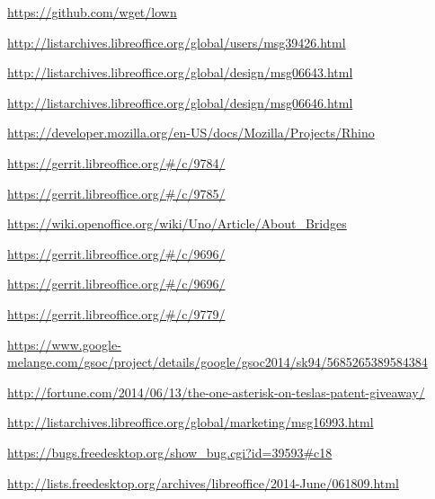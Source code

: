 \documentclass{article}
\begin{document}
\begin{thebibliography}{30}

\url{https://github.com/wget/lown}

    \url{http://listarchives.libreoffice.org/global/users/msg39426.html}

    \url{http://listarchives.libreoffice.org/global/design/msg06643.html}

    \url{http://listarchives.libreoffice.org/global/design/msg06646.html}

    \url{https://developer.mozilla.org/en-US/docs/Mozilla/Projects/Rhino}

    \url{https://gerrit.libreoffice.org/#/c/9784/}

    \url{https://gerrit.libreoffice.org/#/c/9785/}

    \url{https://wiki.openoffice.org/wiki/Uno/Article/About_Bridges}

    \url{https://gerrit.libreoffice.org/#/c/9696/}

    \url{https://gerrit.libreoffice.org/#/c/9696/}

    \url{https://gerrit.libreoffice.org/#/c/9779/}

    \url{https://www.google-melange.com/gsoc/project/details/google/gsoc2014/sk94/5685265389584384}

    \url{http://fortune.com/2014/06/13/the-one-asterisk-on-teslas-patent-giveaway/}

    \url{http://listarchives.libreoffice.org/global/marketing/msg16993.html}

    \url{https://bugs.freedesktop.org/show_bug.cgi?id=39593#c18}

    \url{http://lists.freedesktop.org/archives/libreoffice/2014-June/061809.html}

\end{thebibliography}
\end{document}
